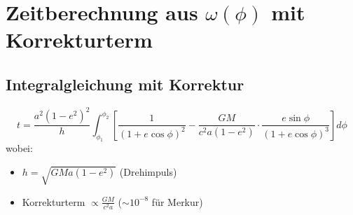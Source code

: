 \section{Zeitberechnung aus $\omega(\phi)$ mit Korrekturterm}
\subsection{Integralgleichung mit Korrektur}
\[
t = \frac{a^2(1-e^2)^2}{h} \int_{\phi_1}^{\phi_2} 
\left[
\frac{1}{(1+e\cos\phi)^2} 
- \frac{GM}{c^2 a(1-e^2)} \cdot \frac{e\sin\phi}{(1+e\cos\phi)^3}
\right] d\phi
\]
wobei:
\begin{itemize}
\item $h = \sqrt{GMa(1-e^2)}$ (Drehimpuls)
\item Korrekturterm $\propto \frac{GM}{c^2 a}$ ($\sim10^{-8}$ für Merkur)
\end{itemize}